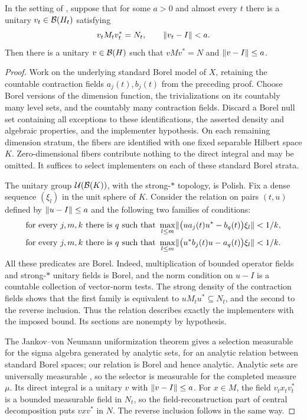 \begin{lemma}\label{lem:measurable-implementers}
In the setting of , suppose that for some $a>0$
and almost every $t$ there is a unitary $v_t\in\mathcal B(H_t)$ satisfying
\[
 v_t M_t v_t^*=N_t,\qquad\lVert v_t-I\rVert<a.
\]
Then there is a unitary $v\in\mathcal B(H)$ such that
$vMv^*=N$ and $\lVert v-I\rVert\leq a$.
\end{lemma}

\begin{proof}
Work on the underlying standard Borel model of $X$, retaining the
countable contraction fields $a_j(t),b_j(t)$ from the preceding proof.
Choose Borel versions of the dimension function, the trivializations
on its countably many level sets, and the countably many contraction
fields.  Discard a Borel null set containing all exceptions to these
identifications, the asserted density and algebraic properties, and
the implementer hypothesis.  On each remaining dimension stratum,
the fibers are identified with one fixed separable Hilbert space $K$.
Zero-dimensional fibers contribute nothing to the direct integral
and may be omitted.  It suffices to select implementers on each of
these standard Borel strata.

The unitary group $\mathcal U(\mathcal B(K))$, with the strong-$*$ topology, is
Polish.  Fix a dense sequence $(\xi_l)$ in the unit sphere of $K$.
Consider the relation on pairs $(t,u)$ defined by
$\lVert u-I\rVert\leq a$ and the following two families of conditions:
\begin{align*}
 &\text{for every }j,m,k\text{ there is }q\text{ such that }
 \max_{l\leq m}
 \lVert\bigl(u a_j(t)u^*-b_q(t)\bigr)\xi_l\rVert<1/k,\\
 &\text{for every }j,m,k\text{ there is }q\text{ such that }
 \max_{l\leq m}
 \lVert\bigl(u^* b_j(t)u-a_q(t)\bigr)\xi_l\rVert<1/k.
\end{align*}
All these predicates are Borel.  Indeed, multiplication of bounded
operator fields and strong-$*$ unitary fields is Borel, and the norm
condition on $u-I$ is a countable collection of vector-norm tests.
The strong density of the contraction fields shows that the first
family is equivalent to $uM_tu^*\subseteq N_t$, and the second to the
reverse inclusion.  Thus the relation describes exactly the
implementers with the imposed bound.  Its sections are nonempty by
hypothesis.

The Jankov--von Neumann uniformization theorem
\cite[Theorem~18.1]{Kechris1995} gives a selection measurable for the
sigma algebra generated by analytic sets, for an analytic relation
between standard Borel spaces; our relation is Borel and hence analytic.
Analytic sets are universally measurable
\cite[Theorem~21.10]{Kechris1995}, so the selector is measurable for the
completed measure $\mu$.  Its direct integral is
a unitary $v$ with $\lVert v-I\rVert\leq a$.  For $x\in M$, the field
$v_t x_t v_t^*$ is a bounded measurable field in $N_t$, so the
field-reconstruction part of central decomposition puts $vxv^*$ in
$N$.  The reverse inclusion follows in the same way.
\end{proof}

